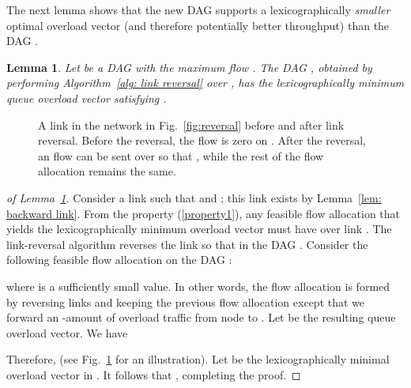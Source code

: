 \documentclass{sig-alternate-2013}
\newtheorem{lemma}{Lemma}
\begin{document}
The next lemma shows that the new DAG  supports a lexicographically \emph{smaller} optimal overload vector (and therefore potentially better throughput) than the DAG .
\begin{lemma} \label{lem: monotonicity}
Let  be a DAG with the maximum flow . The DAG , obtained by performing  Algorithm~\ref{alg: link reversal} over , has the lexicographically minimum queue overload vector satisfying .
\end{lemma}
\begin{figure}[h]
\centering
{}

\caption{A link  in the network in Fig.~\ref{fig:reversal} before and after link reversal. Before the reversal, the flow  is zero on .  After the reversal, an  flow can be sent over  so that , while the rest of the flow allocation remains the same.}
\label{fig: monotonicity}
\end{figure}
\begin{proof}[of Lemma~\ref{lem: monotonicity}]
Consider a link  such that  and  ; this link exists by Lemma~\ref{lem: backward link}. From the property (\ref{property1}), any feasible flow allocation  that yields the lexicographically minimum overload vector  must have  over link . The link-reversal algorithm reverses the link  so that  in the DAG . Consider the following feasible flow allocation  on the DAG :

where  is a sufficiently small value. In other words, the flow allocation  is formed by reversing links and keeping the previous flow allocation  except that we forward an -amount of overload traffic from node  to . Let  be the resulting queue overload vector. We have

Therefore,  (see Fig.~\ref{fig: monotonicity} for an illustration). Let  be the lexicographically minimal overload vector in . It follows that , completing the proof.
\end{proof}
\end{document}
